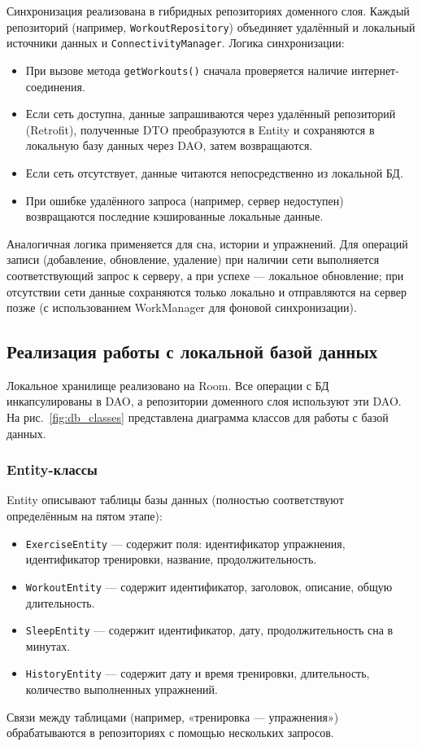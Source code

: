 Синхронизация реализована в гибридных репозиториях доменного слоя. Каждый репозиторий (например, \texttt{WorkoutRepository}) объединяет удалённый и локальный источники данных и \texttt{ConnectivityManager}. Логика синхронизации:
\begin{itemize}
    \item При вызове метода \texttt{getWorkouts()} сначала проверяется наличие интернет-соединения.
    \item Если сеть доступна, данные запрашиваются через удалённый репозиторий (Retrofit), полученные DTO преобразуются в Entity и сохраняются в локальную базу данных через DAO, затем возвращаются.
    \item Если сеть отсутствует, данные читаются непосредственно из локальной БД.
    \item При ошибке удалённого запроса (например, сервер недоступен) возвращаются последние кэшированные локальные данные.
\end{itemize}
Аналогичная логика применяется для сна, истории и упражнений. Для операций записи (добавление, обновление, удаление) при наличии сети выполняется соответствующий запрос к серверу, а при успехе — локальное обновление; при отсутствии сети данные сохраняются только локально и отправляются на сервер позже (с использованием WorkManager для фоновой синхронизации).

\subsection{Реализация работы с локальной базой данных}

Локальное хранилище реализовано на Room. Все операции с БД инкапсулированы в DAO, а репозитории доменного слоя используют эти DAO. На рис.~\ref{fig:db_classes} представлена диаграмма классов для работы с базой данных.

\subsubsection{Entity-классы}

Entity описывают таблицы базы данных (полностью соответствуют определённым на пятом этапе):
\begin{itemize}
    \item \texttt{ExerciseEntity} — содержит поля: идентификатор упражнения, идентификатор тренировки, название, продолжительность.
    \item \texttt{WorkoutEntity} — содержит идентификатор, заголовок, описание, общую длительность.
    \item \texttt{SleepEntity} — содержит идентификатор, дату, продолжительность сна в минутах.
    \item \texttt{HistoryEntity} — содержит дату и время тренировки, длительность, количество выполненных упражнений.
\end{itemize}
Связи между таблицами (например, «тренировка — упражнения») обрабатываются в репозиториях с помощью нескольких запросов.

